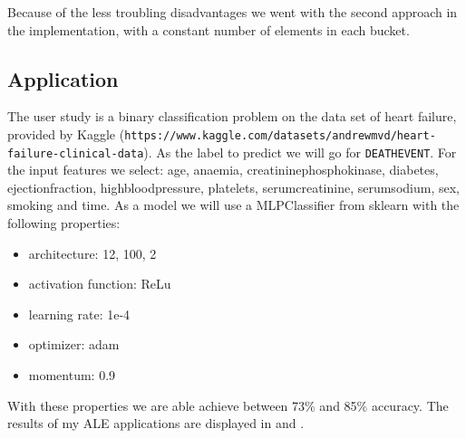 \documentclass[11pt,
  a4paper,
  parskip=half, %
  BCOR=10mm, %
  english,
  ]{article}
\begin{document}
Because of the less troubling disadvantages we went with the second approach in the implementation, with a constant number of elements in each bucket. 

\subsection{Application} \label{section:Application}
The user study is a binary classification problem on the data set of heart failure, provided by Kaggle (\texttt{https://www.kaggle.com/datasets/andrewmvd/heart-failure-clinical-data}). As the label to predict we will go for \texttt{DEATH\textunderscore EVENT}. For the input features we select: 
age, anaemia, creatinine\textunderscore phosphokinase, diabetes, ejection\textunderscore fraction,	high\textunderscore blood\textunderscore pressure, platelets, serum\textunderscore creatinine, serum\textunderscore sodium,	sex, smoking and time.
As a model we will use a MLPClassifier from sklearn with the following properties:
\begin{itemize}
    \item architecture: 12, 100, 2
    \item activation function: ReLu
    \item learning rate: 1e-4
    \item optimizer: adam
    \item momentum: 0.9
\end{itemize}
With these properties we are able achieve between 73\% and 85\% accuracy.
The results of my ALE applications are displayed in  and .
\end{document}
